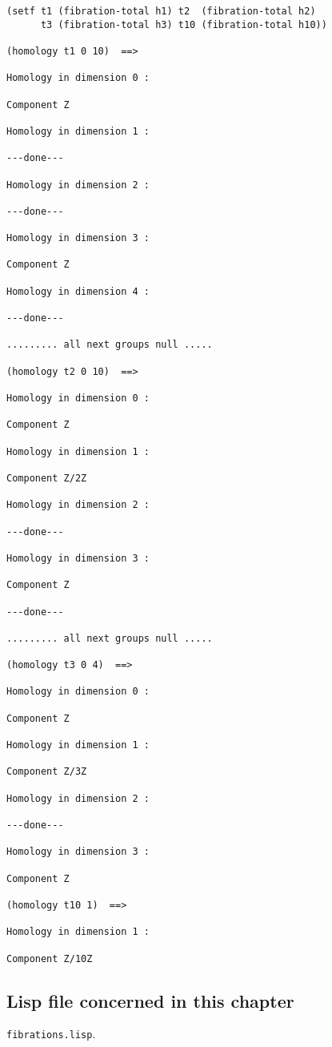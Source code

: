 {\footnotesize\begin{verbatim}
(setf t1 (fibration-total h1) t2  (fibration-total h2) 
      t3 (fibration-total h3) t10 (fibration-total h10))

(homology t1 0 10)  ==>

Homology in dimension 0 :

Component Z

Homology in dimension 1 :

---done---

Homology in dimension 2 :

---done---

Homology in dimension 3 :

Component Z

Homology in dimension 4 :

---done---

......... all next groups null .....

(homology t2 0 10)  ==>

Homology in dimension 0 :

Component Z

Homology in dimension 1 :

Component Z/2Z

Homology in dimension 2 :

---done---

Homology in dimension 3 :

Component Z

---done---

......... all next groups null .....

(homology t3 0 4)  ==>

Homology in dimension 0 :

Component Z

Homology in dimension 1 :

Component Z/3Z

Homology in dimension 2 :

---done---

Homology in dimension 3 :

Component Z

(homology t10 1)  ==>

Homology in dimension 1 :

Component Z/10Z
\end{verbatim}}

\subsection* {Lisp file concerned in this chapter}

{\tt fibrations.lisp}.


